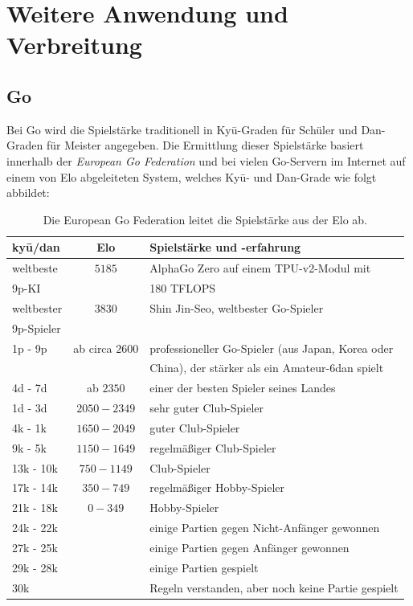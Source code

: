 \chapter{Weitere Anwendung und Verbreitung}

\section{Go}

Bei Go wird die Spielstärke traditionell in Kyū-Graden für Schüler und Dan-Graden für Meister angegeben. Die Ermittlung dieser Spielstärke basiert innerhalb der \textit{European Go Federation} und bei vielen Go-Servern im Internet auf einem von Elo abgeleiteten System, welches Kyū- und Dan-Grade wie folgt abbildet:

\begin{table}[htbp]
    \centering
    \begin{tabular}{l | c | l}
        \toprule
        \textbf{kyū/dan} & \textbf{Elo} & \textbf{Spielstärke und -erfahrung} \\
        \midrule
        weltbeste & $5185$ & AlphaGo Zero auf einem TPU-v2-Modul mit \\
        9p-KI & & 180 TFLOPS \cite{silver2017} \\
        weltbester & $3830$ & Shin Jin-Seo, weltbester Go-Spieler \\
        9p-Spieler & & \\
        1p - 9p & ab circa $2600$ & professioneller Go-Spieler (aus Japan, Korea oder \\
        & & China), der stärker als ein Amateur-6dan spielt \\
        4d - 7d & ab $2350$ & einer der besten Spieler seines Landes \\
        1d - 3d & $2050 - 2349$ & sehr guter Club-Spieler \\
        4k - 1k & $1650 - 2049$ & guter Club-Spieler \\
        9k - 5k & $1150 - 1649$ & regelmäßiger Club-Spieler \\
        13k - 10k & $750 - 1149$ & Club-Spieler \\
        17k - 14k & $350 - 749$ & regelmäßiger Hobby-Spieler \\
        21k - 18k & $0 - 349$ & Hobby-Spieler \\
        24k - 22k &  & einige Partien gegen Nicht-Anfänger gewonnen \\
        27k - 25k &  & einige Partien gegen Anfänger gewonnen \\
        29k - 28k &  & einige Partien gespielt \\
        30k &  & Regeln verstanden, aber noch keine Partie gespielt \\
        \bottomrule
    \end{tabular}
    \caption{Die European Go Federation leitet die Spielstärke aus der Elo ab.}
    \label{tab:go_elo}
\end{table}




